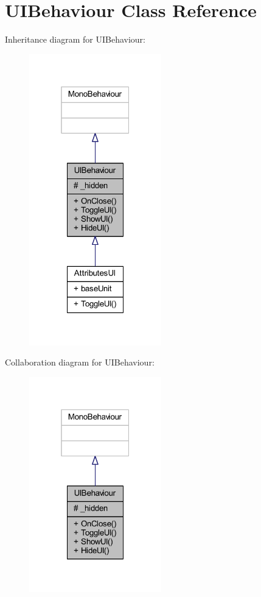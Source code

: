 \hypertarget{class_u_i_behaviour}{}\section{U\+I\+Behaviour Class Reference}
\label{class_u_i_behaviour}


Inheritance diagram for U\+I\+Behaviour\+:
\nopagebreak
\begin{figure}[H]
\begin{center}
\leavevmode
\includegraphics[width=163pt]{class_u_i_behaviour__inherit__graph}
\end{center}
\end{figure}


Collaboration diagram for U\+I\+Behaviour\+:
\nopagebreak
\begin{figure}[H]
\begin{center}
\leavevmode
\includegraphics[width=163pt]{class_u_i_behaviour__coll__graph}
\end{center}
\end{figure}
